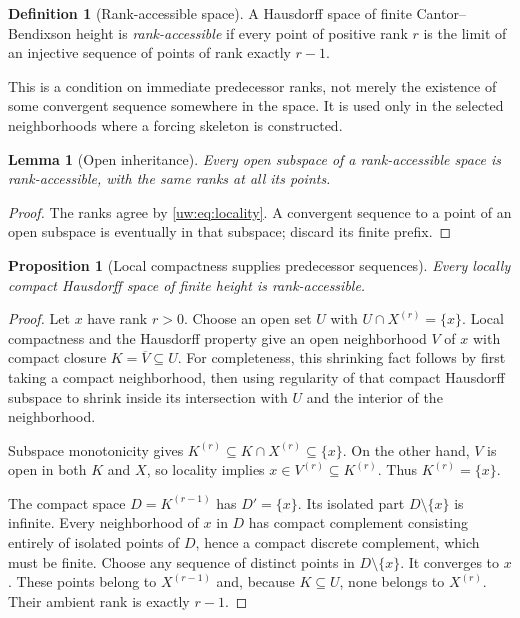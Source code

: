 \documentclass[11pt,letterpaper]{article}
\numberwithin{equation}{section}
\newtheorem{proposition}[proposition]{Proposition}
\newtheorem{lemma}[lemma]{Lemma}
\theoremstyle{definition}
\newtheorem{definition}[definition]{Definition}
\theoremstyle{remark}
\theoremstyle{definition}
\begin{document}
\begin{definition}[Rank-accessible space]\label{uw:def:accessible}
A Hausdorff space of finite Cantor--Bendixson height is \emph{rank-accessible}
if every point of positive rank $r$ is the limit of an injective sequence
of points of rank exactly $r-1$.
\end{definition}

This is a condition on immediate predecessor ranks, not merely the existence
of some convergent sequence somewhere in the space. It is used only in the
selected neighborhoods where a forcing skeleton is constructed.

\begin{lemma}[Open inheritance]\label{uw:lem:open-inheritance}
Every open subspace of a rank-accessible space is rank-accessible, with the
same ranks at all its points.
\end{lemma}
\begin{proof}
The ranks agree by \eqref{uw:eq:locality}. A convergent sequence to a point of
an open subspace is eventually in that subspace; discard its finite prefix.
\end{proof}

\begin{proposition}[Local compactness supplies predecessor sequences]
\label{uw:prop:lch}
Every locally compact Hausdorff space of finite height is rank-accessible.
\end{proposition}
\begin{proof}
Let $x$ have rank $r>0$. Choose an open set $U$ with
$U\cap X^{(r)}=\{x\}$. Local compactness and the Hausdorff property give an
open neighborhood $V$ of $x$ with compact closure $K=\overline V\subseteq U$.
For completeness, this shrinking fact follows by first taking a compact
neighborhood, then using regularity of that compact Hausdorff subspace to
shrink inside its intersection with $U$ and the interior of the neighborhood.

Subspace monotonicity gives $K^{(r)}\subseteq K\cap X^{(r)}\subseteq\{x\}$.
On the other hand, $V$ is open in both $K$ and $X$, so locality implies
$x\in V^{(r)}\subseteq K^{(r)}$. Thus $K^{(r)}=\{x\}$.

The compact space $D=K^{(r-1)}$ has $D'=\{x\}$. Its isolated part
$D\setminus\{x\}$ is infinite. Every neighborhood of $x$ in $D$ has compact
complement consisting entirely of isolated points of $D$, hence a compact
discrete complement, which must be finite. Choose any sequence of distinct
points in $D\setminus\{x\}$. It converges to $x$. These points belong to
$X^{(r-1)}$ and, because $K\subseteq U$, none belongs to $X^{(r)}$.
Their ambient rank is exactly $r-1$.
\end{proof}
\end{document}
